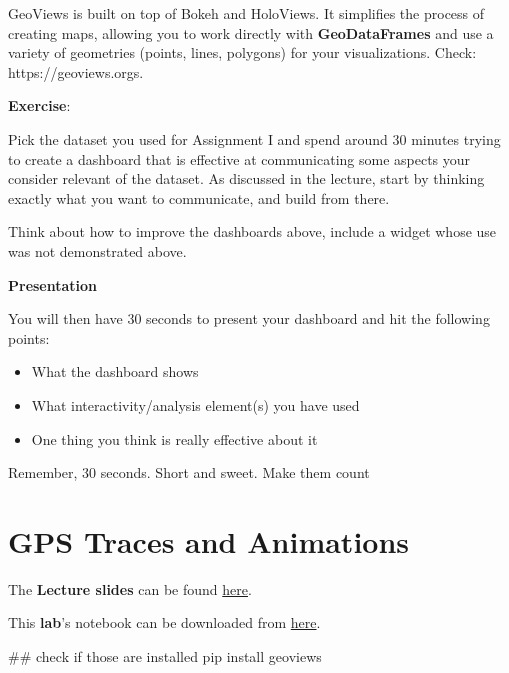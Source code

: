 \documentclass[
  letterpaper,
  DIV=11,
  numbers=noendperiod]{scrreprt}
\newenvironment{Shaded}{\begin{snugshade}}{\end{snugshade}}
\newcommand{\CommentTok}[1]{\textcolor[rgb]{0.37,0.37,0.37}{#1}}
\newcommand{\NormalTok}[1]{\textcolor[rgb]{0.00,0.23,0.31}{#1}}
\providecommand{\tightlist}{%
  \setlength{\itemsep}{0pt}\setlength{\parskip}{0pt}}\usepackage{longtable,booktabs,array}
\begin{document}
GeoViews is built on top of Bokeh and HoloViews. It simplifies the
process of creating maps, allowing you to work directly with
\textbf{GeoDataFrames} and use a variety of geometries (points, lines,
polygons) for your visualizations. Check: https://geoviews.orgs.

\textbf{Exercise}:

Pick the dataset you used for Assignment I and spend around 30 minutes
trying to create a dashboard that is effective at communicating some
aspects your consider relevant of the dataset. As discussed in the
lecture, start by thinking exactly what you want to communicate, and
build from there.

Think about how to improve the dashboards above, include a widget whose
use was not demonstrated above.

\textbf{Presentation}

You will then have 30 seconds to present your dashboard and hit the
following points:

\begin{itemize}
\tightlist
\item
  What the dashboard shows
\item
  What interactivity/analysis element(s) you have used
\item
  One thing you think is really effective about it
\end{itemize}

Remember, 30 seconds. Short and sweet. Make them count


\chapter{GPS Traces and Animations}\label{gps-traces-and-animations}

The \textbf{Lecture slides} can be found
\href{https://github.com/GDSL-UL/wma/raw/main/lectures/w09.pdf}{here}.

This \textbf{lab}'s notebook can be downloaded from
\href{https://github.com/GDSL-UL/wma/blob/main/labs/w09_advanced.ipynb}{here}.

\begin{Shaded}
\begin{Highlighting}[]
\CommentTok{\#\# check if those are installed}
\NormalTok{pip install geoviews}
\end{Highlighting}
\end{Shaded}
\end{document}
